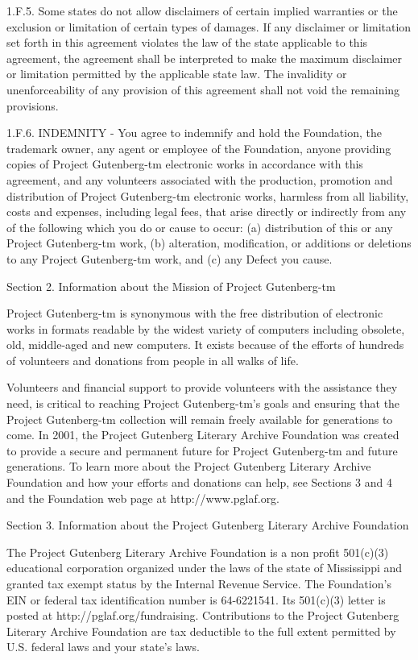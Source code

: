 1.F.5.  Some states do not allow disclaimers of certain implied
warranties or the exclusion or limitation of certain types of damages.
If any disclaimer or limitation set forth in this agreement violates the
law of the state applicable to this agreement, the agreement shall be
interpreted to make the maximum disclaimer or limitation permitted by
the applicable state law.  The invalidity or unenforceability of any
provision of this agreement shall not void the remaining provisions.

1.F.6.  INDEMNITY - You agree to indemnify and hold the Foundation, the
trademark owner, any agent or employee of the Foundation, anyone
providing copies of Project Gutenberg-tm electronic works in accordance
with this agreement, and any volunteers associated with the production,
promotion and distribution of Project Gutenberg-tm electronic works,
harmless from all liability, costs and expenses, including legal fees,
that arise directly or indirectly from any of the following which you do
or cause to occur: (a) distribution of this or any Project Gutenberg-tm
work, (b) alteration, modification, or additions or deletions to any
Project Gutenberg-tm work, and (c) any Defect you cause.


Section  2.  Information about the Mission of Project Gutenberg-tm

Project Gutenberg-tm is synonymous with the free distribution of
electronic works in formats readable by the widest variety of computers
including obsolete, old, middle-aged and new computers.  It exists
because of the efforts of hundreds of volunteers and donations from
people in all walks of life.

Volunteers and financial support to provide volunteers with the
assistance they need, is critical to reaching Project Gutenberg-tm's
goals and ensuring that the Project Gutenberg-tm collection will
remain freely available for generations to come.  In 2001, the Project
Gutenberg Literary Archive Foundation was created to provide a secure
and permanent future for Project Gutenberg-tm and future generations.
To learn more about the Project Gutenberg Literary Archive Foundation
and how your efforts and donations can help, see Sections 3 and 4
and the Foundation web page at http://www.pglaf.org.


Section 3.  Information about the Project Gutenberg Literary Archive
Foundation

The Project Gutenberg Literary Archive Foundation is a non profit
501(c)(3) educational corporation organized under the laws of the
state of Mississippi and granted tax exempt status by the Internal
Revenue Service.  The Foundation's EIN or federal tax identification
number is 64-6221541.  Its 501(c)(3) letter is posted at
http://pglaf.org/fundraising.  Contributions to the Project Gutenberg
Literary Archive Foundation are tax deductible to the full extent
permitted by U.S. federal laws and your state's laws.

